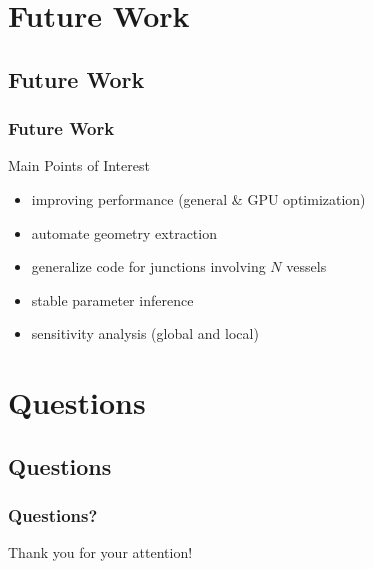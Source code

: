 \documentclass[compress]{beamer}
\begin{document}
\section{Future Work}
\subsection{Future Work}
\begin{frame}
	\frametitle{Future Work}
	\begin{block}{Main Points of Interest}
		\begin{itemize}
			\item<1-> improving performance (general \& GPU optimization)
			\item<2-> automate geometry extraction
			\item<3-> generalize code for junctions involving $N$ vessels
			\item<4-> stable parameter inference
			\item<5-> sensitivity analysis (global and local)
		\end{itemize}
	\end{block}
	\vspace{5mm}
\end{frame}


\section{Questions}
\subsection{Questions}
\begin{frame}
	\frametitle{Questions?}
	Thank you for your attention!
\end{frame}
\end{document}
